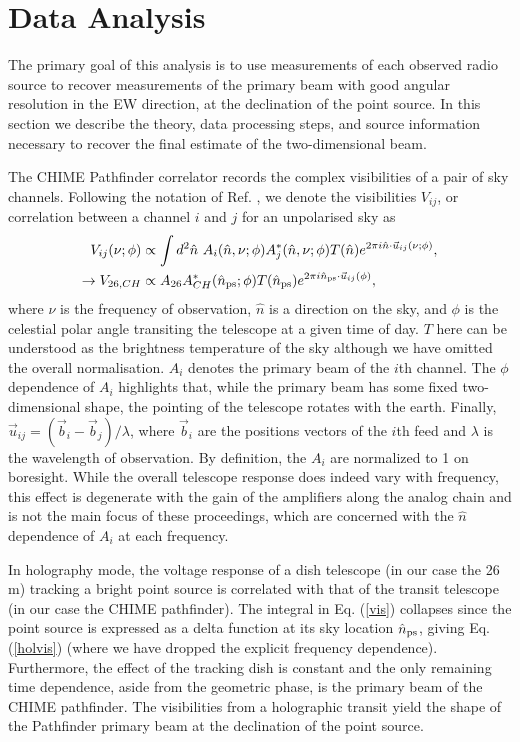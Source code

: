\section{Data Analysis} \label{ch:hol:sec:analysis}
The primary goal of this analysis is to use measurements of each observed radio source to recover measurements of the primary beam with good angular resolution in the EW direction, at the declination of the point source. In this section we describe the theory, data processing steps, and source information necessary to recover the final estimate of the two-dimensional beam. 

The CHIME Pathfinder correlator records the complex visibilities of a pair of sky channels. Following the notation of Ref. \citep{mmodes1}, we denote the visibilities $V_{ij}$, or correlation between a channel $i$ and $j$ for an unpolarised sky as
\begin{align}
V_{ij}(\nu ; \phi) & \propto \int d^2\hat{n}~A_i(\hat{n}, \nu;\phi)A^*_j(\hat{n}, \nu;\phi) T(\hat{n}) e^{2\pi i \hat{n}\cdot\vec{u}_{ij}(\nu;\phi)},
\label{vis}
\\
\rightarrow V_{26,CH} & \propto A_{26}A^*_{CH}(\hat{n}_{\rm ps};\phi) T(\hat{n}_{\rm ps}) e^{2\pi i \hat{n}_{\rm ps}\cdot\vec{u}_{ij}(\phi)},
\label{holvis}
\end{align}
where $\nu$ is the frequency of observation, $\hat{n}$ is a direction on the sky, and $\phi$ is the celestial polar angle transiting the telescope at a given time of day. $T$ here can be understood as the brightness temperature of the sky although we have omitted the overall normalisation. $A_i$ denotes the primary beam of the $i$th channel. The $\phi$ dependence of $A_i$ highlights that, while the primary beam has some fixed two-dimensional shape, the pointing of the telescope rotates with the earth. Finally, $\vec{u}_{ij}=(\vec{b}_i - \vec{b}_j)/ \lambda$, where $\vec{b}_i$ are the positions vectors of the $i$th feed and $\lambda$ is the wavelength of observation. By definition, the $A_i$ are normalized to 1 on boresight. While the overall telescope response does indeed vary with frequency, this effect is degenerate with the gain of the amplifiers along the analog chain and is not the main focus of these proceedings, which are concerned with the $\hat{n}$ dependence of $A_i$ at each frequency. 

In holography mode, the voltage response of a dish telescope (in our case the 26 m) tracking a bright point source is correlated with that of the transit telescope (in our case the CHIME pathfinder). The integral in Eq. (\ref{vis}) collapses since the point source is expressed as a delta function at its sky location $\hat{n}_{\rm ps}$, giving Eq. (\ref{holvis}) (where we have dropped the explicit frequency dependence). Furthermore, the effect of the tracking dish is constant and the only remaining time dependence, aside from the geometric phase, is the primary beam of the CHIME pathfinder. The visibilities from a holographic transit yield the shape of the Pathfinder primary beam at the declination of the point source.

